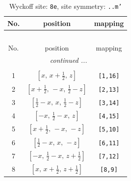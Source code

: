 \documentclass[fleqn,8pt]{jsarticle}
\begin{document}
\renewcommand{\arraystretch}{1.2}
\begin{longtable}{ccc}
\caption{Wyckoff site: {\tt 8e}, site symmetry: {\tt ..m'}}
 \\
 \hline \hline
No. & position & mapping \\ \hline \endfirsthead

\multicolumn{2}{l}{\tablename\ \thetable{}} \\
 \hline \hline
No. & position & mapping \\ \hline \endhead

 \hline \hline
\multicolumn{2}{r}{\footnotesize\it continued ...} \\ \endfoot

 \hline \hline
\multicolumn{2}{r}{} \\ \endlastfoot

1 & $\left[ x,\, x + \frac{1}{2},\, z \right]$ & {\tt [1,16]} \\ \hline
2 & $\left[ x + \frac{1}{2},\, - x,\, \frac{1}{2} - z \right]$ & {\tt [2,13]} \\ \hline
3 & $\left[ \frac{1}{2} - x,\, x,\, \frac{1}{2} - z \right]$ & {\tt [3,14]} \\ \hline
4 & $\left[ - x,\, \frac{1}{2} - x,\, z \right]$ & {\tt [4,15]} \\ \hline
5 & $\left[ x + \frac{1}{2},\, - x,\, - z \right]$ & {\tt [5,10]} \\ \hline
6 & $\left[ \frac{1}{2} - x,\, x,\, - z \right]$ & {\tt [6,11]} \\ \hline
7 & $\left[ - x,\, \frac{1}{2} - x,\, z + \frac{1}{2} \right]$ & {\tt [7,12]} \\ \hline
8 & $\left[ x,\, x + \frac{1}{2},\, z + \frac{1}{2} \right]$ & {\tt [8,9]} \\
\end{longtable}
\renewcommand{\arraystretch}{1.2}
\end{document}
